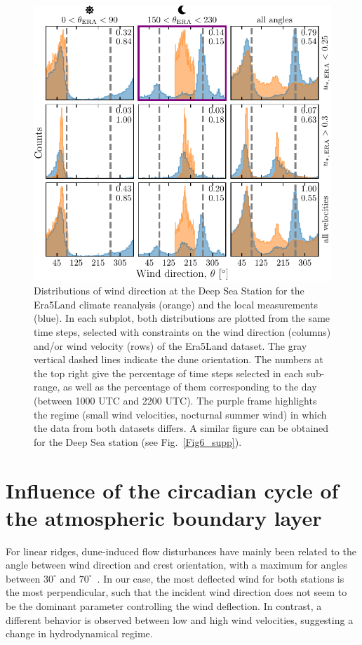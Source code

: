   \begin{figure}
    \centering
    \includegraphics[scale=1]{Figures/Figure3.pdf}
    \caption{Distributions of wind direction at the Deep Sea Station for the Era5Land climate reanalysis (orange) and the local measurements (blue). In each subplot, both distributions are plotted from the same time steps, selected with constraints on the wind direction (columns) and/or wind velocity (rows) of the Era5Land dataset. The gray vertical dashed lines indicate the dune orientation. The numbers at the top right give the percentage of time steps selected in each sub-range, as well as the percentage of them corresponding to the day (between 1000 UTC and 2200 UTC). The purple frame highlights the regime (small wind velocities, nocturnal summer wind) in which the data from both datasets differs. A similar figure can be obtained for the Deep Sea station (see Fig.~\ref{Fig6_supp}).}
    \label{Fig3}
  \end{figure}


  \section{Influence of the circadian cycle of the atmospheric boundary layer}

  For linear ridges, dune-induced flow disturbances have mainly been related to the angle between wind direction and crest orientation, with a maximum for angles between $30^{\circ}$ and $70^{\circ}$~\citep{Walker2009, Hesp2015}. In our case, the most deflected wind for both stations is the most perpendicular, such that the incident wind direction does not seem to be the dominant parameter controlling the wind deflection. In contrast, a different behavior is observed between  low and high wind velocities, suggesting a change in hydrodynamical regime.

